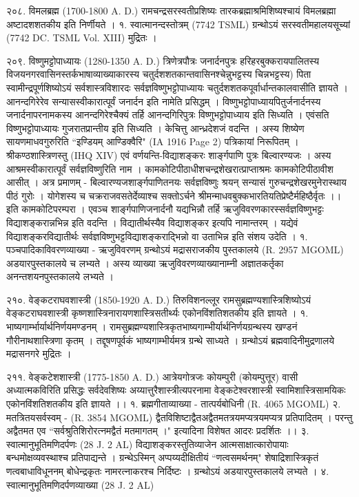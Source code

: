 २०८. विमलब्रह्म (1700-1800 A. D.)
रामचन्द्रसरस्वतीप्रशिष्यः तारकब्रह्माश्रमिशिष्यश्चायं विमलब्रह्मा अष्टादशशतकीय इति निर्णीयते । 
१. स्वात्मानन्दस्तोत्रम् (7742 TSML) ग्रन्थोऽयं सरस्वतीमहालयसूच्यां (7742 DC. TSML Vol. XIII) मुद्रितः ।

२०९. विष्णुमट्टोपाध्यायः (1280-1350 A. D.)
त्रिणेत्रपौत्रः जनार्दनपुत्रः हरिहरबुक्करायपालितस्य विजयनगरवासिनस्तर्कभाषाव्याख्याकारस्य चतुर्दशशतकान्तवासिनश्चेन्नुभट्टस्य चिन्नभट्टस्य) पिता स्वामीन्द्रपूर्णशिष्योऽयं सर्वशास्त्रविशारदः सर्वज्ञविष्णुभट्टोपाध्यायः चतुर्दशशतकपूर्वार्धान्तकालवासीति ज्ञायते । आनन्दगिरेरेव सन्यासस्वीकारात्पूर्वं जनार्दन इति नामेति प्रसिद्धम् । विष्णुभट्टोपाध्यायपितुर्जनार्दनस्य जनार्दनापरनामकस्य आनन्दगिरेश्चैक्यं तर्हि आनन्दगिरिपुत्रः विष्णुभट्टोपाध्याय इति सिध्यति । एवंसति विष्णुभट्टोपाध्यायः गुजरातप्रान्तीय इति सिध्यति । केचित्तु आन्ध्रदेशजं वदन्ति । अस्य शिष्येण सायणमाधवगुरुरिति ``इण्डियम् आण्डिक्वैरि" (IA 1916 Page 2) पत्रिकायां निरूपितम् ।
श्रीकण्ठशास्त्रिणस्तु (IHQ XIV) एवं वर्णयन्ति-विद्याशङ्करः शार्ङ्गपाणि पुत्रः बिल्वारण्यजः । अस्य आश्रमस्वीकारात्पूर्वं सर्वज्ञविष्णुरिति नाम । कामकोटिपीठाधीशचन्द्रशेखरात्प्राप्ताश्रमः कामकोटिपीठावीश आसीत् । अत्र प्रमाणम् -
बिल्वारण्यजशार्ङ्गपाणितनयः सर्वज्ञविष्णुः श्रयन्
सन्यासं गुरुचन्द्रशेखरमुनेरास्थाय पीठं गुरोः ।
योगेशस्य च चक्रराजवसतेर्देव्याश्च सक्तोऽर्चने
श्रीमन्माधवबुक्कभारतियतिप्रेष्टैर्महिष्ठैर्वृतः ।। इति
कामकोटिपरम्परा । एवञ्च शार्ङ्गपाणिजनार्दनौ यद्यभिन्नौ तर्हि ऋजुविवरणकारस्सर्वज्ञविष्णुभट्टः विद्याशङ्करान्नभिन्न इति वदन्ति ।
विद्यातीर्थस्यैव विद्याशङ्कर इत्यपि नामान्तरम् । यद्येवं विद्याशङ्करविद्यातीर्थः सर्वज्ञविष्णुभट्टविद्याशङ्कराद्भिन्नो वा उताभिन्न इति संशय उदेति ।
१. पञ्चपादिकाविवरणव्याख्या - ऋजुविवरणम् ग्रन्थोऽयं मद्रासराजकीय पुस्तकालये (R. 2957 MGOML) अडयारपुस्तकालये च लभ्यते । अस्य व्याख्या ऋजुविवरणव्याख्यानाम्नी अज्ञातकर्तृका अनन्तशयनपुस्तकालये लभ्यते ।

२१०. वेङ्कटराघवशास्त्री (1850-1920 A. D.)
तिरुविशनल्लूर रामसुब्रह्मण्यशास्त्रिशिष्योऽयं वेङ्कटराघवशास्त्री कृष्णशास्त्रिनारायणशास्त्रिसतीर्थ्यः एकोनविंशतिशतकीय इति ज्ञायते ।
१. भाष्यगार्म्भार्यार्थनिर्णयमण्डनम् । रामसुब्रह्मण्यशास्त्रिकृतभाष्यगाम्भीर्यार्थनिर्णयग्रन्थस्य खण्डनं गौरीनाथशास्त्रिणा कृतम् । तद्दूषणपूर्वकं भाष्यगाम्भीर्यमत्र ग्रन्थे साध्यते । ग्रन्थोऽयं ब्रह्मवादिनीमुद्रणालये मद्रासनगरे मुद्रितः ।

२११. वेङ्कटेशशास्त्री (1775-1850 A. D.)
आत्रेयगोत्रजः कोयम्पुरी (कोयम्पुत्तूर) वासी अध्यात्मकविरिति प्रसिद्धः सर्वदेवशिष्यः अय्यात्तुरैशास्त्रीत्यपरनामा वेङ्कटेश्वरशास्त्री स्वामिशास्त्रिसामयिकः एकोनविंशतिशतकीय इति ज्ञायते ।।
१. ब्रह्मगीताव्याख्या - तात्पर्यबोधिनी (R. 4065 MGOML)
२. मतत्रितयसर्वस्वम् - (R. 3854 MGOML)
द्वैतविशिष्टाद्वैतअद्वैतमतत्रयमप्यत्रयमप्यत्र प्रतिपादितम् । परन्तु अद्वैतमत एव ``सर्वश्रुतिशिरोरत्नमद्वैतं मतमागतम् ।" इत्यादिना विशेषत आदरः प्रदर्शितः ।।
३. स्वात्मानुभूतिमणिदर्पणः (28 J. 2 AL)
विद्याशङ्करस्तुतिव्याजेन आत्मसाक्षात्कारोपायाः बन्धमोक्षव्यवस्थाश्च प्रतिपाद्यन्ते । ग्रन्थेऽस्मिन् अप्पय्यदीक्षितीयं ``णत्वसमर्थनम्" शेषाद्रिशास्त्रिकृतं णत्वबाधाविधूननम् बोधेन्द्रकृतः नामरत्नाकरश्च निर्दिष्टः । ग्रन्थोऽयं अडयारपुस्तकालये लभ्यते ।
४. स्वात्मानुभूतिमणिदर्पणव्याख्या (28 J. 2 AL)

